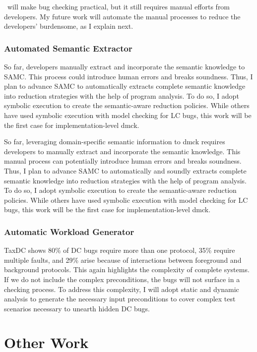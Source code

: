 \documentclass[11pt]{article}
\begin{document}
\fullcheck\ will make bug checking practical, but it still requires manual
efforts from developers. My future work will automate the manual processes
to reduce the developers' burdensome, as I explain next.

\subsubsection*{Automated Semantic Extractor}

So far, developers manually extract and incorporate the semantic knowledge to
SAMC. This process could introduce human errors and breaks soundness. Thus, I
plan to advance SAMC to automatically extracts complete semantic
knowledge into reduction strategies with the help of program analysis. To do
so, I adopt symbolic execution to create the semantic-aware reduction policies.
While others have used symbolic execution with model checking for LC bugs, this
work will be the first case for implementation-level dmck. 

So far, leveraging domain-specific semantic information to dmck requires
developers to manually extract and incorporate the semantic knowledge. This
manual process can potentially introduce human errors and breaks soundness.
Thus, I plan to advance SAMC to automatically and soundly extracts complete
semantic knowledge into reduction strategies with the help of program analysis.
To do so, I adopt symbolic execution to create the semantic-aware reduction
policies. While others have used symbolic execution with model checking for LC
bugs, this work will be the first case for implementation-level dmck. 
\fi

\subsubsection*{Automatic Workload Generator}

TaxDC shows 80\% of DC bugs require more than one protocol, 35\% require
multiple faults, and 29\% arise because of interactions between foreground and
background protocols. This again highlights the complexity of complete
systems. If we do not include the complex preconditions, the bugs will not
surface in a checking process. To address this complexity, I will adopt static
and dynamic analysis to generate the necessary input preconditions to cover
complex test scenarios necessary to unearth hidden DC bugs.

\section{Other Work}
\end{document}
